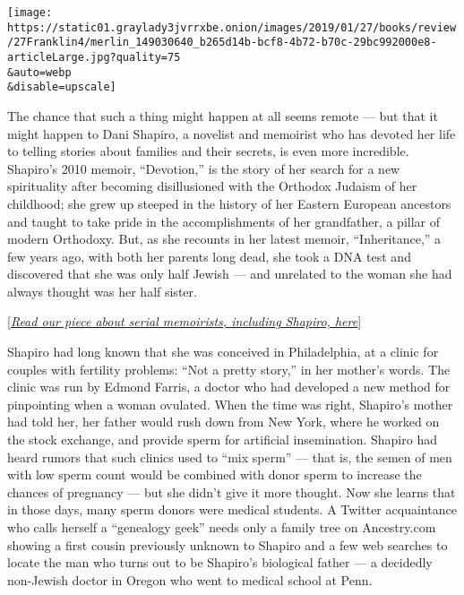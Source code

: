 \texttt{[image: https://static01.graylady3jvrrxbe.onion/images/2019/01/27/books/review/27Franklin4/merlin\_149030640\_b265d14b-bcf8-4b72-b70c-29bc992000e8-articleLarge.jpg?quality=75\\\&auto=webp\\\&disable=upscale]}

The chance that such a thing might happen at all seems remote --- but
that it might happen to Dani Shapiro, a novelist and memoirist who has
devoted her life to telling stories about families and their secrets, is
even more incredible. Shapiro's 2010 memoir, ``Devotion,'' is the story
of her search for a new spirituality after becoming disillusioned with
the Orthodox Judaism of her childhood; she grew up steeped in the
history of her Eastern European ancestors and taught to take pride in
the accomplishments of her grandfather, a pillar of modern Orthodoxy.
But, as she recounts in her latest memoir, ``Inheritance,'' a few years
ago, with both her parents long dead, she took a DNA test and discovered
that she was only half Jewish --- and unrelated to the woman she had
always thought was her half sister.

{[}\emph{\href{https://www.nytimes3xbfgragh.onion/2019/01/10/books/serial-memoir-writer.html?action=click\&module=Well\&pgtype=Homepage\&section=Books}{Read
our piece about serial memoirists, including Shapiro, here}}{]}

Shapiro had long known that she was conceived in Philadelphia, at a
clinic for couples with fertility problems: ``Not a pretty story,'' in
her mother's words. The clinic was run by Edmond Farris, a doctor who
had developed a new method for pinpointing when a woman ovulated. When
the time was right, Shapiro's mother had told her, her father would rush
down from New York, where he worked on the stock exchange, and provide
sperm for artificial insemination. Shapiro had heard rumors that such
clinics used to ``mix sperm'' --- that is, the semen of men with low
sperm count would be combined with donor sperm to increase the chances
of pregnancy --- but she didn't give it more thought. Now she learns
that in those days, many sperm donors were medical students. A Twitter
acquaintance who calls herself a ``genealogy geek'' needs only a family
tree on Ancestry.com showing a first cousin previously unknown to
Shapiro and a few web searches to locate the man who turns out to be
Shapiro's biological father --- a decidedly non-Jewish doctor in Oregon
who went to medical school at Penn.

